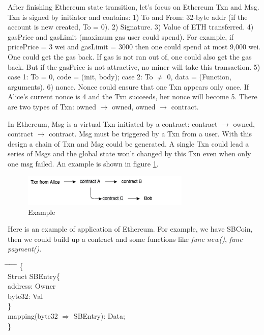 \documentclass[twoside]{article}
\begin{document}
After finishing Ethereum state transition, let's focus on Ethereum Txn and Msg. Txn is signed by initiator and contains: 1) To and From: 32-byte addr (if the account is new created, To = 0). 2) Signature. 3) Value of ETH transferred. 4) gasPrice and gasLimit (maximum gas user could spend). For example, if pricePrice = 3 wei and gasLimit = 3000 then one could spend at most 9,000 wei. One could get the gas back. If gas is not ran out of, one could also get the gas back. But if the gasPrice is not attractive, no miner will take this transaction. 5) case 1: To = 0, code = (init, body); case 2: To $\neq$ 0, data = (Function, arguments). 6) nonce. Nonce could ensure that one Txn appears only once. If Alice's current nonce is 4 and the Txn succeeds, her nonce will become 5. There are two types of Txn: owned $\rightarrow$ owned, owned $\rightarrow$ contract. 

In Ethereum, Msg is a virtual Txn initiated by a contract: contract $\rightarrow$ owned, contract $\rightarrow$ contract. Msg must be triggered by a Txn from a user. With this design a chain of Txn and Msg could be generated. A single Txn could lead a series of Msgs and the global state won't changed by this Txn even when only one msg failed. An example is shown in figure \ref{fig example}.
\begin{figure}[h]
\centering
\includegraphics[width=8cm]{fig_4.png}
\caption{Example}
\label{fig example}
\end{figure}

Here is an example of application of Ethereum. For example, we have SBCoin, then we could build up a contract and some functions like \emph{func new()}, \emph{func payment()}.
\begin{tabbing}
\hspace*{.25in} \= \hspace*{.25in} \= \hspace*{.25in} \= \hspace*{.25in} \= \hspace*{.25in} \=\kill
{} \{ \\
\>\> Struct SBEntry\{ \\
\>\>\> address: Owner\\
\>\>\> byte32: Val\\
\>\>\}\\
\>\>mapping(byte32 $\Rightarrow$ SBEntry): Data;\\
\> \}
\end{tabbing}
%
\end{document}
